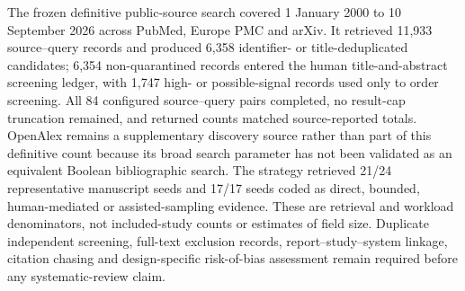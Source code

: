 The frozen definitive public-source search covered 1 January 2000 to 10 September 2026 across PubMed, Europe PMC and arXiv. It retrieved 11,933 source--query records and produced 6,358 identifier- or title-deduplicated candidates; 6,354 non-quarantined records entered the human title-and-abstract screening ledger, with 1,747 high- or possible-signal records used only to order screening. All 84 configured source--query pairs completed, no result-cap truncation remained, and returned counts matched source-reported totals. OpenAlex remains a supplementary discovery source rather than part of this definitive count because its broad search parameter has not been validated as an equivalent Boolean bibliographic search. The strategy retrieved 21/24 representative manuscript seeds and 17/17 seeds coded as direct, bounded, human-mediated or assisted-sampling evidence. These are retrieval and workload denominators, not included-study counts or estimates of field size. Duplicate independent screening, full-text exclusion records, report--study--system linkage, citation chasing and design-specific risk-of-bias assessment remain required before any systematic-review claim.
